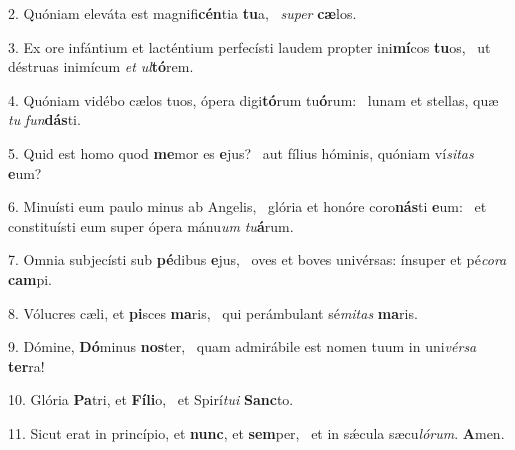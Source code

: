 2. Quóniam eleváta est magnifi\textbf{cén}tia \textbf{tu}a, \ast\  \textit{su}\textit{per} \textbf{cæ}los.\

3. Ex ore infántium et lacténtium perfecísti laudem propter ini\textbf{mí}cos \textbf{tu}os, \ast\  ut déstruas inimícum \textit{et} \textit{ul}\textbf{tó}rem.\

4. Quóniam vidébo cælos tuos, ópera digi\textbf{tó}rum tu\textbf{ó}rum: \ast\  lunam et stellas, quæ \textit{tu} \textit{fun}\textbf{dás}ti.\

5. Quid est homo quod \textbf{me}mor es \textbf{e}jus? \ast\  aut fílius hóminis, quóniam ví\textit{si}\textit{tas} \textbf{e}um?\

6. Minuísti eum paulo minus ab Angelis, \dag\  glória et honóre coro\textbf{nás}ti \textbf{e}um: \ast\  et constituísti eum super ópera mánu\textit{um} \textit{tu}\textbf{á}rum.\

7. Omnia subjecísti sub \textbf{pé}dibus \textbf{e}jus, \ast\  oves et boves univérsas: ínsuper et pé\textit{co}\textit{ra} \textbf{cam}pi.\

8. Vólucres cæli, et \textbf{pi}sces \textbf{ma}ris, \ast\  qui perámbulant sé\textit{mi}\textit{tas} \textbf{ma}ris.\

9. Dómine, \textbf{Dó}minus \textbf{nos}ter, \ast\  quam admirábile est nomen tuum in uni\textit{vér}\textit{sa} \textbf{ter}ra!\

10. Glória \textbf{Pa}tri, et \textbf{Fí}\textbf{li}o, \ast\  et Spirí\textit{tu}\textit{i} \textbf{Sanc}to.\

11. Sicut erat in princípio, et \textbf{nunc}, et \textbf{sem}per, \ast\  et in sǽcula sæcu\textit{ló}\textit{rum}. \textbf{A}men.\

